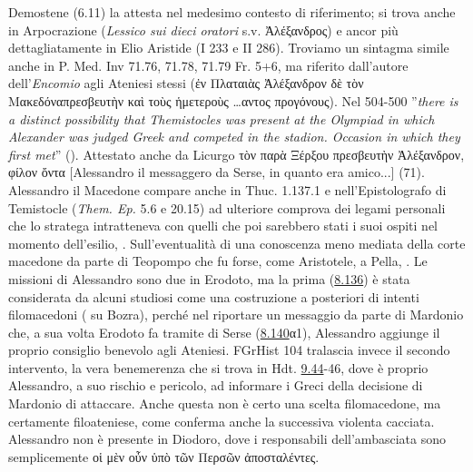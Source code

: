 {Demostene (6.11) la attesta nel medesimo contesto di riferimento; si trova anche in Arpocrazione (\emph{Lessico sui dieci oratori} s.v. \textgreek{ Ἀλέξανδρος}) e ancor più dettagliatamente in Elio Aristide (I 233 e II 286). Troviamo un sintagma simile anche in P. Med. Inv 71.76, 71.78, 71.79 Fr. 5+6, ma riferito dall'autore dell'\emph{Encomio} agli Ateniesi stessi (\textgreek{ἐν Πλαταιὰς Ἀλέξανδρον δὲ τὸν Μακεδόναπρεσβευτὴν καὶ τοὺς ἡμετεροὺς …αντος προγόνους}). Nel 504-500 ''\emph{there is a distinct possibility that Themistocles was present at the Olympiad in which Alexander was judged Greek and competed in the stadion. Occasion in which they first met}'' (\cite[39]{Cole1978}). Attestato anche da Licurgo  \textgreek{τὸν παρὰ Ξέρξου πρεσβευτὴν Ἀλέξανδρον, φίλον ὄντα} [Alessandro il messaggero da Serse, in quanto era amico...] (71). Alessandro il Macedone compare anche in Thuc. 1.137.1 e nell'Epistolografo di Temistocle (\emph{Them. Ep.}  5.6 e 20.15) ad ulteriore comprova dei legami personali che lo stratega intratteneva con quelli che poi sarebbero stati i suoi ospiti nel momento dell'esilio, \cite[66]{CulassoGastaldi1990}. Sull'eventualità di una conoscenza meno mediata della corte macedone da parte di Teopompo che fu forse, come Aristotele, a Pella, \cite[46]{Ferretto1984}.
Le missioni di Alessandro sono due in Erodoto, ma la prima (\href{http://data.perseus.org/citations/urn:cts:greekLit:tlg0016.tlg001.perseus-grc1:8.136}{8.136}) è stata considerata da alcuni studiosi come una costruzione a posteriori di intenti filomacedoni (\cite[18]{Badian2006} su Bozra), perché nel riportare un messaggio da parte di Mardonio che, a sua volta Erodoto fa tramite di Serse (\href{http://data.perseus.org/citations/urn:cts:greekLit:tlg0016.tlg001.perseus-grc1:8.140}{8.140}\textgreek{α}1), Alessandro aggiunge il proprio consiglio benevolo agli Ateniesi. FGrHist 104 tralascia invece il secondo intervento, la vera benemerenza che si trova in Hdt. \href{http://data.perseus.org/citations/urn:cts:greekLit:tlg0016.tlg001.perseus-grc1:9.44}{9.44}-46, dove è proprio Alessandro, a suo rischio e pericolo, ad informare i Greci della decisione di Mardonio di attaccare. Anche questa non è certo una scelta filomacedone, ma certamente filoateniese, come conferma anche la successiva violenta cacciata. Alessandro non è presente in Diodoro, dove i responsabili dell'ambasciata sono semplicemente \textgreek{οἱ μὲν οὖν ὑπὸ τῶν Περσῶν ἀποσταλέντες}.
}
